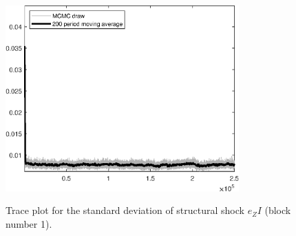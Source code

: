 \begin{figure}[H]
\centering
  \includegraphics[width=0.8\textwidth]{BRS_growth_ext_fd_v1/graphs/TracePlot_SE_e_ZI_blck_1}\\
    \caption{Trace plot for the standard deviation of structural shock ${e_ZI}$ (block number 1).}
\end{figure}
